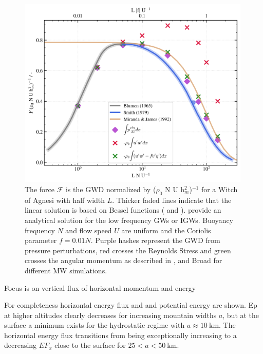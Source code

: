 \begin{figure}[tbp]
    \centering
    \includegraphics[width=0.99\textwidth]{figures_model/GWD-linearTheory-Q3D.png}
    \caption{The force $\mathcal{F}$ is the GWD normalized by ($\rho_0$ N U h$_m^2$)$^{-1}$ for a Witch of Agnesi with half width $L$. Thicker faded lines indicate that the linear solution is based on Bessel functions (\cite[]{blumen_momentum_1965} and \cite[]{smith_influence_1979}). \textcite[]{miranda_non-linear_1992} provide an analytical solution for the low frequency GWs or IGWs. Buoyancy frequency $N$ and flow speed $U$ are uniform and the Coriolis parameter $f=0.01N$. Purple hashes represent the GWD from pressure perturbations, red crosses the Reynolds Stress and green crosses the angular momentum as described in \textcite[]{bretherton_momentum_1969}, \textcite[]{smith_influence_1979} and Broad for different MW simulations.}
    \label{fig:GWD-MWs}
\end{figure}


Focus is on vertical flux of horizontal momentum and energy

For completeness horizontal energy flux and and potential energy are shown. Ep at higher altitudes clearly decreases for increasing mountain widths $a$, but at the surface a minimum exists for the hydrostatic regime with $a \approx \SI{10}{\kilo\meter}$. The horizontal energy flux transitions from being exceptionally increasing to a decreasing $EF_x$ close to the surface for $ 25 < a < \SI{50}{\kilo\meter}$. 

